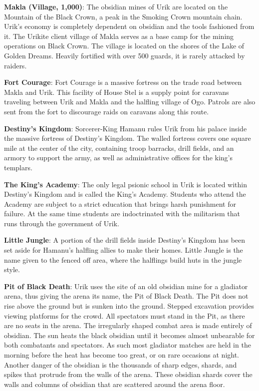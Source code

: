 {
	\textbf{Makla (Village, 1,000)}: The obsidian mines of Urik are located on the Mountain of the Black Crown, a peak in the Smoking Crown mountain chain. Urik's economy is completely dependent on obsidian and the tools fashioned from it. The Urikite client village of Makla serves as a base camp for the mining operations on Black Crown. The village is located on the shores of the Lake of Golden Dreams. Heavily fortified with over 500 guards, it is rarely attacked by raiders.

	\textbf{Fort Courage}: Fort Courage is a massive fortress on the trade road between Makla and Urik. This facility of House Stel is a supply point for caravans traveling between Urik and Makla and the halfling village of Ogo. Patrols are also sent from the fort to discourage raids on caravans along this route.
}
{
	\textbf{Destiny's Kingdom}: Sorcerer-King Hamanu rules Urik from his palace inside the massive fortress of Destiny's Kingdom. The walled fortress covers one square mile at the center of the city, containing troop barracks, drill fields, and an armory to support the army, as well as administrative offices for the king's templars.

	\textbf{The King's Academy}: The only legal psionic school in Urik is located within Destiny's Kingdom and is called the King's Academy. Students who attend the Academy are subject to a strict education that brings harsh punishment for failure. At the same time students are indoctrinated with the militarism that runs through the government of Urik.

	\textbf{Little Jungle}: A portion of the drill fields inside Destiny's Kingdom has been set aside for Hamanu's halfling allies to make their homes. Little Jungle is the name given to the fenced off area, where the halflings build huts in the jungle style.

	\textbf{Pit of Black Death}: Urik uses the site of an old obsidian mine for a gladiator arena, thus giving the arena its name, the Pit of Black Death. The Pit does not rise above the ground but is sunken into the ground. Stepped excavation provides viewing platforms for the crowd. All spectators must stand in the Pit, as there are no seats in the arena. The irregularly shaped combat area is made entirely of obsidian. The sun heats the black obsidian until it becomes almost unbearable for both combatants and spectators. As such most gladiator matches are held in the morning before the heat has become too great, or on rare occasions at night. Another danger of the obsidian is the thousands of sharp edges, shards, and spikes that protrude from the walls of the arena. These obsidian shards cover the walls and columns of obsidian that are scattered around the arena floor.

}
